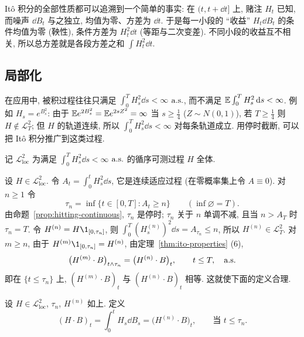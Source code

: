\begin{intuition}
It\^o 积分的全部性质都可以追溯到一个简单的事实: 在 $(t,t+\dd t]$ 上, 赌注 $H_t$ 已知, 而噪声 $\dd B_t$ 与之独立, 均值为零、方差为 $\dd t$. 于是每一小段的 ``收益'' $H_t\dd B_t$ 的条件均值为零 (鞅性), 条件方差为 $H_t^2\dd t$ (等距与二次变差). 不同小段的收益互不相关, 所以总方差就是各段方差之和 $\int H_t^2\dd t$.
\end{intuition}

\subsection{局部化}

在应用中, 被积过程往往只满足 $\int_0^TH_s^2\dd s<\infty$ $\text{a.s.}$, 而不满足 $\mathbb{E}\int_0^TH_s^2\mathop{}\!\mathrm{d} s<\infty$. 例如 $H_s=e^{B_s^2}$: 由于 $\mathbb{E} e^{2B_s^2}=\mathbb{E} e^{2sZ^2}=\infty$ 当 $s\ge\frac14$ ($Z\sim N(0,1)$), 若 $T\ge\frac14$ 则 $H\notin\mathscr{L}^2_T$; 但 $H$ 的轨道连续, 所以 $\int_0^TH_s^2\dd s<\infty$ 对每条轨道成立. 用停时截断, 可以把 It\^o 积分推广到这类过程.

\begin{definition}\label{def:L2-loc}
记 $\mathscr{L}^2_{\mathrm{loc}}$ 为满足 $\int_0^TH_s^2\dd s<\infty$ $\text{a.s.}$ 的循序可测过程 $H$ 全体.
\end{definition}

设 $H\in\mathscr{L}^2_{\mathrm{loc}}$. 令 $A_t=\int_0^tH_s^2\dd s$, 它是连续适应过程 (在零概率集上令 $A\equiv0$). 对 $n\ge1$ 令
\[
\tau_n=\inf\{t\in[0,T]: A_t\ge n\}\qquad(\inf\varnothing=T).
\]
由命题~\ref{prop:hitting-continuous}, $\tau_n$ 是停时; $\tau_n$ 关于 $n$ 单调不减, 且当 $n>A_T$ 时 $\tau_n=T$. 令 $H^{(n)}=H\1_{[0,\tau_n]}$, 则 $\int_0^T(H^{(n)}_s)^2\dd s=A_{\tau_n}\le n$, 所以 $H^{(n)}\in\mathscr{L}^2_T$. 对 $m\ge n$, 由于 $H^{(m)}\1_{[0,\tau_n]}=H^{(n)}$, 由定理~\ref{thm:ito-properties} (6),
\begin{equation}\label{eq:localization-consistent}
\big(H^{(m)}\cdot B\big)_{t\wedge\tau_n}=\big(H^{(n)}\cdot B\big)_t,\qquad t\le T,\quad\text{a.s.}
\end{equation}
即在 $\{t\le\tau_n\}$ 上, $(H^{(m)}\cdot B)_t$ 与 $(H^{(n)}\cdot B)_t$ 相等. 这就使下面的定义合理.

\begin{definition}[局部化的 It\^o 积分]\label{def:ito-local}
设 $H\in\mathscr{L}^2_{\mathrm{loc}}$, $\tau_n$, $H^{(n)}$ 如上. 定义
\[
(H\cdot B)_t=\int_0^tH_s\dd B_s=\big(H^{(n)}\cdot B\big)_t,\qquad\text{当 }t\le\tau_n.
\]
\end{definition}

